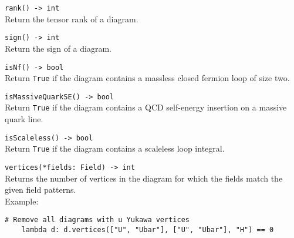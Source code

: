 \begin{basedescript}{\desclabelstyle{\pushlabel}}
   \item[\hspace{-1em}]\colorbox{gray!30}{\lstinline[style=py]|rank() -> int|} \vspace{0.1cm}\\
   Return the tensor rank of a diagram.

   \item[\hspace{-1em}]\colorbox{gray!30}{\lstinline[style=py]|sign() -> int|} \vspace{0.1cm}\\
   Return the sign of a diagram.

   \item[\hspace{-1em}]\colorbox{gray!30}{\lstinline[style=py]|isNf() -> bool|} \vspace{0.1cm}\\
   Return \texttt{True} if the diagram contains a massless closed fermion loop of size two.

   \item[\hspace{-1em}]\colorbox{gray!30}{\lstinline[style=py]|isMassiveQuarkSE() -> bool|} \vspace{0.1cm}\\
   Return \texttt{True} if the diagram contains a QCD self-energy insertion on a massive quark line.

   \item[\hspace{-1em}]\colorbox{gray!30}{\lstinline[style=py]|isScaleless() -> bool|} \vspace{0.1cm}\\
   Return \texttt{True} if the diagram contains a scaleless loop integral.

   \item[\hspace{-1em}]\colorbox{gray!30}{\lstinline[style=py]|vertices(*fields: Field) -> int|} \vspace{0.1cm}\\
   Returns the number of vertices in the diagram for which the fields match the given field patterns. \vspace{0.1cm} \\
   Example:
   \begin{lstlisting}[style=py]
    # Remove all diagrams with u Yukawa vertices
    lambda d: d.vertices(["U", "Ubar"], ["U", "Ubar"], "H") == 0
   \end{lstlisting}


\end{basedescript}
